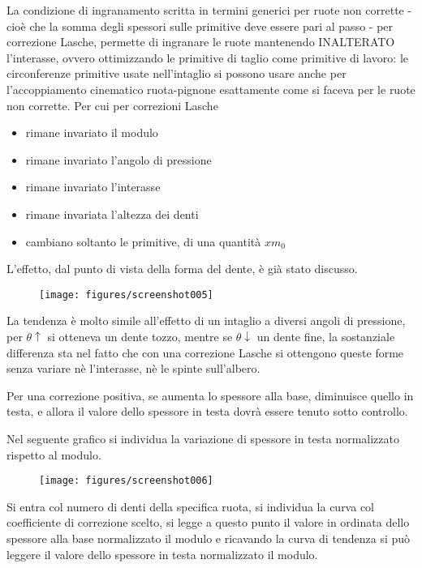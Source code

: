 \documentclass[a4paper, 15pt]{article}
\begin{document}
\begin{adjustwidth}{2in}{}
				La condizione di ingranamento scritta in termini generici per ruote non corrette - cioè che la somma degli spessori sulle primitive deve essere pari al passo - per correzione Lasche, permette di ingranare le ruote mantenendo INALTERATO l'interasse, ovvero ottimizzando le primitive di taglio come primitive di lavoro: le circonferenze primitive usate nell'intaglio si possono usare anche per l'accoppiamento cinematico ruota-pignone esattamente come si faceva per le ruote non corrette. 
\newpage 				
				Per cui per correzioni Lasche
				\begin{itemize}
					\item rimane invariato il modulo
					\item rimane invariato l'angolo di pressione 
					\item rimane invariato l'interasse
					\item rimane invariata l'altezza dei denti
					\item cambiano soltanto le primitive, di una quantità $xm_0$
				\end{itemize}
				
				L'effetto, dal punto di vista della forma del dente, è già stato discusso. 
				\begin{figure}[H]
					\centering
					\texttt{[image: figures/screenshot005]}
					\label{fig:screenshot005}
				\end{figure}
				La tendenza è molto simile all'effetto di un intaglio a diversi angoli di pressione, per $\theta\uparrow$ si otteneva un dente tozzo, mentre se $\theta\downarrow$ un dente fine, la sostanziale differenza sta nel fatto che con una correzione Lasche si ottengono queste forme senza variare nè l'interasse, nè le spinte sull'albero. \newline 
				
				Per una correzione positiva, se aumenta lo spessore alla base, diminuisce quello in testa, e allora il valore dello spessore in testa dovrà essere tenuto sotto controllo. 
				
				Nel seguente grafico si individua la variazione di spessore in testa normalizzato rispetto al modulo. 
				 \begin{figure}[H]
				 	\centering
				 	\texttt{[image: figures/screenshot006]}
				 	\label{fig:screenshot006}
				 \end{figure}
				 Si entra col numero di denti della specifica ruota, si individua la curva col coefficiente di correzione scelto, si legge a questo punto il valore in ordinata dello spessore alla base normalizzato il modulo e ricavando la curva di tendenza si può leggere il valore dello spessore in testa normalizzato il modulo. 
				 

\end{adjustwidth}
\end{document}
